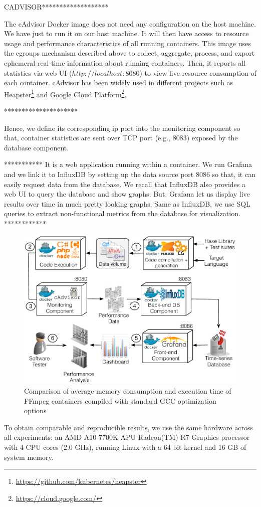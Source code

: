 CADVISOR*******************

The cAdvisor Docker image does not need any configuration on the host machine. We have just to run it on our host machine. It will then have access to resource usage and performance characteristics of all running containers. This image uses the cgroups mechanism described above to collect, aggregate, process, and export ephemeral real-time information about running containers. Then, it reports all statistics via web UI ($http://localhost:8080$) to view live resource consumption of each container. cAdvisor has been widely used in different projects such as Heapster\footnote{\url{https://github.com/kubernetes/heapster}} and Google Cloud Platform\footnote{\url{https://cloud.google.com/}}.
 
*********************

Hence, we define its corresponding ip port into the monitoring component so that, container statistics are sent over TCP port (e.g., 8083) exposed by the database component.

***********
It is a web application running within a container. We run Grafana and we link it to InfluxDB by setting up the data source port 8086 so that, it can easily request data from the database. 
We recall that InfluxDB also provides a web UI to query the database and show graphs. But, Grafana let us display live results over time in much pretty looking graphs. Same as InfluxDB, we use SQL queries to extract non-functional metrics from the database for visualization.
************


\begin{figure}[hbt]
	\centering
	\includegraphics[width=1\linewidth]{Ressources/settingup.pdf}
	\caption{Comparison of average memory consumption and execution time of FFmpeg containers compiled with standard GCC optimization options}
\end{figure}
To obtain comparable and reproducible results, we use the
same hardware across all experiments: an AMD A10-7700K
APU Radeon(TM) R7 Graphics processor with 4 CPU cores
(2.0 GHz), running Linux with a 64 bit kernel and 16 GB of
system memory.
